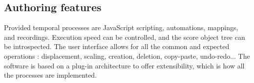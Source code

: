 \documentclass{article}
\newcommand{\timeconstraint}{\textit{time constraint}\xspace}
\begin{document}
\subsection{Authoring features}
Provided temporal processes are JavaScript scripting, automations, mappings, and 
recordings. 
Execution speed can be controlled, and the score object tree can be introspected.
The user interface allows for all the common and expected operations : displacement, scaling, creation, deletion, copy-paste, undo-redo...
The software is based on a plug-in architecture to offer extensibility, which is how all the processes are implemented.
%
%
%
\end{document}
